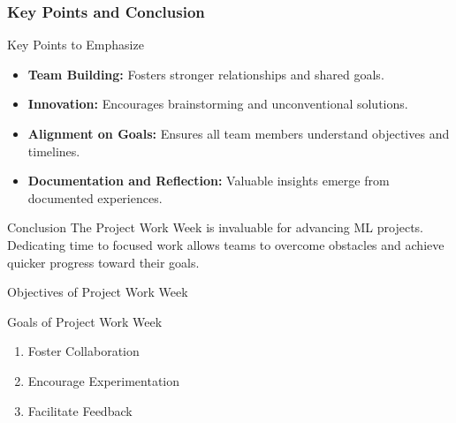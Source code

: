 \documentclass[aspectratio=169]{beamer}
\begin{document}
\begin{frame}[fragile]
    \frametitle{Key Points and Conclusion}
    
    \begin{block}{Key Points to Emphasize}
        \begin{itemize}
            \item \textbf{Team Building:} Fosters stronger relationships and shared goals.
            \item \textbf{Innovation:} Encourages brainstorming and unconventional solutions.
            \item \textbf{Alignment on Goals:} Ensures all team members understand objectives and timelines.
            \item \textbf{Documentation and Reflection:} Valuable insights emerge from documented experiences.
        \end{itemize}
    \end{block}
    
    \begin{block}{Conclusion}
        The Project Work Week is invaluable for advancing ML projects. Dedicating time to focused work allows teams to overcome obstacles and achieve quicker progress toward their goals.
    \end{block}
\end{frame}

\begin{frame}[fragile]{Objectives of Project Work Week}
    \begin{block}{Goals of Project Work Week}
        \begin{enumerate}
            \item Foster Collaboration
            \item Encourage Experimentation
            \item Facilitate Feedback
        \end{enumerate}
    \end{block}
\end{frame}
\end{document}

